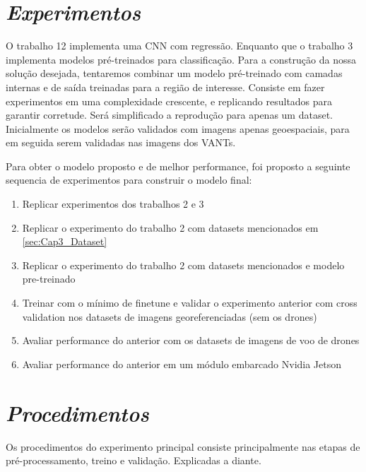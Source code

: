 \section{\textit{Experimentos}}\label{sec:Cap3_Experimentos}

O trabalho 12 implementa uma CNN com regressão. Enquanto que o trabalho 3 implementa modelos pré-treinados para classificação. Para a construção da nossa solução desejada, tentaremos combinar um modelo pré-treinado com camadas internas e de saída treinadas para a região de interesse.
Consiste em fazer experimentos em uma complexidade crescente, e replicando resultados para garantir corretude. Será simplificado a reprodução para apenas um dataset.
Inicialmente os modelos serão validados com imagens apenas geoespaciais, para em seguida serem validadas nas imagens dos VANTs.

Para obter o modelo proposto e de melhor performance, foi proposto a seguinte sequencia de experimentos para construir o modelo final:
\begin{enumerate}
\item  Replicar experimentos dos trabalhos 2 e 3
\item  Replicar o experimento do trabalho 2 com datasets mencionados em \ref{sec:Cap3_Dataset}
\item  Replicar o experimento do trabalho 2 com datasets mencionados e modelo pre-treinado
\item Treinar com o mínimo de finetune e validar o experimento anterior com cross validation nos datasets de imagens georeferenciadas (sem os drones)
\item Avaliar performance do anterior com os datasets de imagens de voo de drones
\item Avaliar performance do anterior em um módulo embarcado Nvidia Jetson
\end{enumerate}


    

\section{\textit{Procedimentos}}\label{sec:Cap3_Procedimentos}

Os procedimentos do experimento principal consiste principalmente nas etapas de 
pré-processamento, treino e validação. Explicadas a diante.

